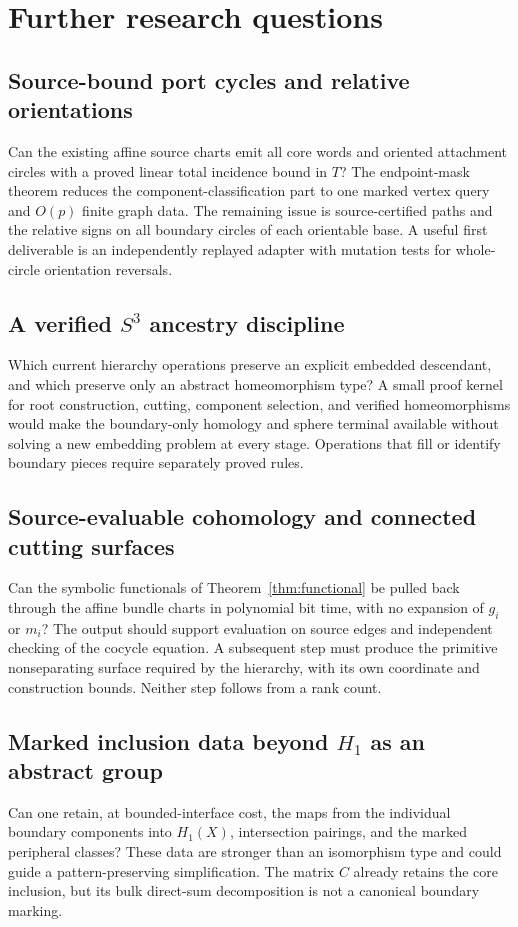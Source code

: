 \documentclass[11pt]{article}
\theoremstyle{definition}
\theoremstyle{remark}
\begin{document}
\section{Further research questions}
\label{sec:future}

\subsection{Source-bound port cycles and relative orientations}
Can the existing affine source charts emit all core words and oriented
attachment circles with a proved linear total incidence bound in $T$?
The endpoint-mask theorem reduces the component-classification part to one
marked vertex query and $O(p)$ finite graph data. The remaining issue is
source-certified paths and the relative signs on all boundary circles of
each orientable base. A useful first deliverable is an independently replayed
adapter with mutation tests for whole-circle orientation reversals.

\subsection{A verified \texorpdfstring{$S^3$}{S3} ancestry discipline}
Which current hierarchy operations preserve an explicit embedded descendant,
and which preserve only an abstract homeomorphism type? A small proof kernel
for root construction, cutting, component selection, and verified
homeomorphisms would make the boundary-only homology and sphere terminal
available without solving a new embedding problem at every stage. Operations
that fill or identify boundary pieces require separately proved rules.

\subsection{Source-evaluable cohomology and connected cutting surfaces}
Can the symbolic functionals of Theorem~\ref{thm:functional} be pulled back
through the affine bundle charts in polynomial bit time, with no expansion
of $g_i$ or $m_i$? The output should support evaluation on source edges and
independent checking of the cocycle equation. A subsequent step must produce
the primitive nonseparating surface required by the hierarchy, with its own
coordinate and construction bounds. Neither step follows from a rank count.

\subsection{Marked inclusion data beyond \texorpdfstring{$H_1$}{H1} as an abstract group}
Can one retain, at bounded-interface cost, the maps from the individual
boundary components into $H_1(X)$, intersection pairings, and the marked
peripheral classes? These data are stronger than an isomorphism type and
could guide a pattern-preserving simplification. The matrix $C$ already
retains the core inclusion, but its bulk direct-sum decomposition is not a
canonical boundary marking.
\end{document}
